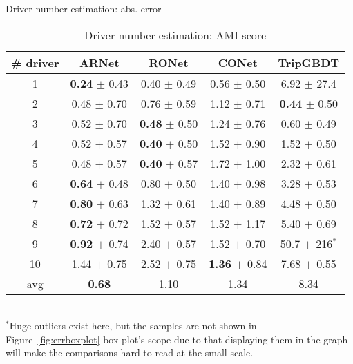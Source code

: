 \documentclass{article}
\begin{document}
\begin{table}[t]
\caption{Driver number estimation: abs. error}
\label{tab:driverclusteringerror}
\tiny
\centering
\begin{tabular}{c|c|c|c|c}
\hline
\# driver & {ARNet} & {RONet} & {CONet} & {TripGBDT} \\
\hline
1 & \textbf{0.24} $\pm$ 0.43 	& 0.40 $\pm$ 0.49		& 0.56 $\pm$ 0.50		& 6.92 $\pm$ 27.4\\
2 & 0.48 $\pm$ 0.70 	& 0.76 $\pm$ 0.59		& 1.12 $\pm$ 0.71		& \textbf{0.44} $\pm$ 0.50\\
3 & 0.52 $\pm$ 0.70 	& \textbf{0.48} $\pm$ 0.50		& 1.24 $\pm$ 0.76		& 0.60 $\pm$ 0.49\\
4 & 0.52 $\pm$ 0.57 	& \textbf{0.40} $\pm$ 0.50		& 1.52 $\pm$ 0.90		& 1.52 $\pm$ 0.50\\
5 & 0.48 $\pm$ 0.57 	& \textbf{0.40} $\pm$ 0.57		& 1.72 $\pm$ 1.00 		& 2.32 $\pm$ 0.61\\
6 & \textbf{0.64} $\pm$ 0.48 	& 0.80 $\pm$ 0.50		& 1.40 $\pm$ 0.98		& 3.28 $\pm$ 0.53\\
7 & \textbf{0.80} $\pm$ 0.63 	& 1.32 $\pm$ 0.61		& 1.40 $\pm$ 0.89		& 4.48 $\pm$ 0.50\\
8 & \textbf{0.72} $\pm$ 0.72 	& 1.52 $\pm$ 0.57		& 1.52 $\pm$ 1.17		& 5.40 $\pm$ 0.69\\
9 & \textbf{0.92} $\pm$ 0.74 	& 2.40 $\pm$ 0.57		& 1.52 $\pm$ 0.70		& 50.7 $\pm$ 216$^*$\\
10& 1.44 $\pm$ 0.75		& 2.52 $\pm$ 0.75		& \textbf{1.36} $\pm$ 0.84		& 7.68 $\pm$ 0.55\\
\hline
avg & \textbf{0.68}
	& {1.10}
	& {1.34}
	& 8.34\\
\hline
\end{tabular}
\\
$^*$Huge outliers exist here, but the samples are not shown in Figure~\ref{fig:errboxplot} box plot's scope due to that displaying them in the graph will make the comparisons hard to read at the small scale.
\vspace{-0.07in}
%
%
\caption{Driver number estimation: AMI score}

\end{table}
\end{document}
